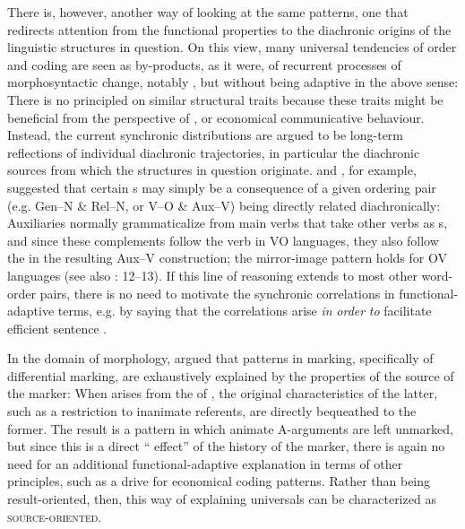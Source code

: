 \documentclass[output=paper]{langsci/langscibook}
\begin{document}
There is, however, another way of looking at the same patterns, one that redirects attention from the functional properties to the diachronic origins of the linguistic structures in question. On this view, many universal tendencies of order and coding are seen as by-products, as it were, of recurrent processes of morphosyntactic change, notably , but without being adaptive in the above sense: There is no principled  on similar structural traits because these traits might be beneficial from the perspective of ,  or economical communicative behaviour. Instead, the current synchronic distributions are argued to be long-term reflections of individual diachronic trajectories, in particular the diachronic sources from which the structures in question originate. \citet{Givón1984} and \citet{Aristar1991}, for example, suggested that certain s may simply be a consequence of a given ordering pair (e.g. Gen–N \& Rel–N, or V–O \& Aux–V) being directly related diachronically: Auxiliaries normally grammaticalize from main verbs that take other verbs as s, and since these complements follow the verb in VO languages, they also follow the  in the resulting Aux–V construction; the mirror-image pattern holds for OV languages (see also \citealt{Lehmann1986}: 12–13). If this line of reasoning extends to most other word-order pairs, there is no need to motivate the synchronic correlations in functional-adaptive terms, e.g. by saying that the correlations arise \textit{in} \textit{order} \textit{to} facilitate efficient sentence . 

In the domain of morphology, \citet{Garrett1990} argued that patterns in  marking, specifically of differential  marking, are exhaustively explained by the properties of the source of the  marker: When   arises from the  of  , the original characteristics of the latter, such as a restriction to inanimate referents, are directly bequeathed to the former. The result is a pattern in which animate A-arguments are left unmarked, but since this is a direct “ effect” \citep{Hopper1991} of the history of the  marker, there is again no need for an additional functional-adaptive explanation in terms of other principles, such as a drive for economical coding patterns. Rather than being result-oriented, then, this way of explaining universals can be characterized as \textsc{source-oriented}.
\end{document}
